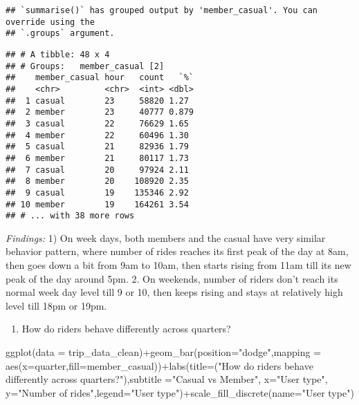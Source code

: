 \documentclass[
]{article}
\newenvironment{Shaded}{\begin{snugshade}}{\end{snugshade}}
\newcommand{\AttributeTok}[1]{\textcolor[rgb]{0.77,0.63,0.00}{#1}}
\newcommand{\FunctionTok}[1]{\textcolor[rgb]{0.00,0.00,0.00}{#1}}
\newcommand{\NormalTok}[1]{#1}
\newcommand{\SpecialCharTok}[1]{\textcolor[rgb]{0.00,0.00,0.00}{#1}}
\newcommand{\StringTok}[1]{\textcolor[rgb]{0.31,0.60,0.02}{#1}}
\providecommand{\tightlist}{%
  \setlength{\itemsep}{0pt}\setlength{\parskip}{0pt}}
\begin{document}
\begin{verbatim}
## `summarise()` has grouped output by 'member_casual'. You can override using the
## `.groups` argument.
\end{verbatim}

\begin{verbatim}
## # A tibble: 48 x 4
## # Groups:   member_casual [2]
##    member_casual hour   count   `%`
##    <chr>         <chr>  <int> <dbl>
##  1 casual        23     58820 1.27 
##  2 member        23     40777 0.879
##  3 casual        22     76629 1.65 
##  4 member        22     60496 1.30 
##  5 casual        21     82936 1.79 
##  6 member        21     80117 1.73 
##  7 casual        20     97924 2.11 
##  8 member        20    108920 2.35 
##  9 casual        19    135346 2.92 
## 10 member        19    164261 3.54 
## # ... with 38 more rows
\end{verbatim}

\emph{Findings:} 1) On week days, both members and the casual have very
similar behavior pattern, where number of rides reaches its first peak
of the day at 8am, then goes down a bit from 9am to 10am, then starts
rising from 11am till its new peak of the day around 5pm. 2. On
weekends, number of riders don't reach its normal week day level till 9
or 10, then keeps rising and stays at relatively high level till 18pm or
19pm.

\begin{enumerate}
\def\labelenumi{\arabic{enumi}.}
\setcounter{enumi}{4}
\tightlist
\item
  How do riders behave differently across quarters?
\end{enumerate}

\begin{Shaded}
\begin{Highlighting}[]
\FunctionTok{ggplot}\NormalTok{(}\AttributeTok{data =}\NormalTok{ trip\_data\_clean)}\SpecialCharTok{+}\FunctionTok{geom\_bar}\NormalTok{(}\AttributeTok{position=}\StringTok{"dodge"}\NormalTok{,}\AttributeTok{mapping =} \FunctionTok{aes}\NormalTok{(}\AttributeTok{x=}\NormalTok{quarter,}\AttributeTok{fill=}\NormalTok{member\_casual))}\SpecialCharTok{+}\FunctionTok{labs}\NormalTok{(}\AttributeTok{title=}\NormalTok{(}\StringTok{"How do riders behave differently across quarters?"}\NormalTok{),}\AttributeTok{subtitle =}\StringTok{"Casual vs Member"}\NormalTok{, }\AttributeTok{x=}\StringTok{"User type"}\NormalTok{, }\AttributeTok{y=}\StringTok{"Number of rides"}\NormalTok{,}\AttributeTok{legend=}\StringTok{"User type"}\NormalTok{)}\SpecialCharTok{+}\FunctionTok{scale\_fill\_discrete}\NormalTok{(}\AttributeTok{name=}\StringTok{"User type"}\NormalTok{)}
\end{Highlighting}
\end{Shaded}
\end{document}
